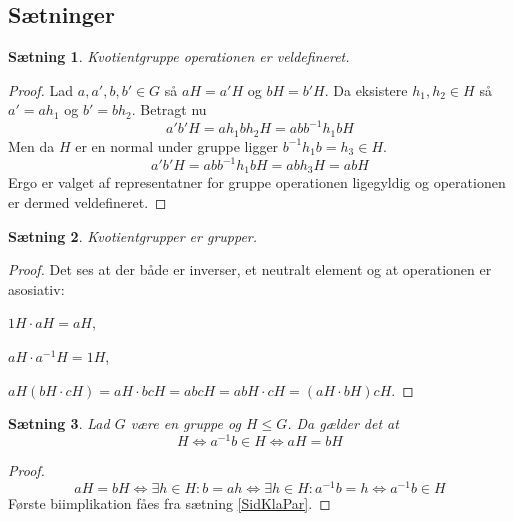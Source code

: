 \documentclass{article}
\newcommand{\inv}{^{-1}}
\newcommand{\biimp}{\Leftrightarrow}
\newtheorem{setn}{Sætning}
\begin{document}
		\subsection*{Sætninger}
		\begin{setn}
			Kvotientgruppe operationen er veldefineret.
		\end{setn}
		\begin{proof}
			Lad $a,a',b,b' \in G$ så $aH = a'H$ og $bH = b'H$. Da eksistere $h_1, h_2 \in H$
			så $a' = ah_1$ og $b' = bh_2$. Betragt nu
			$$a'b'H = ah_1bh_2H = abb\inv h_1bH$$
			Men da $H$ er en normal under gruppe ligger $b\inv h_1 b = h_3 \in H$.
			$$a'b'H = abb\inv h_1bH = abh_3H = abH$$
			Ergo er valget af representatner for gruppe operationen ligegyldig og operationen
			er dermed veldefineret.
		\end{proof}
		\begin{setn}
			Kvotientgrupper er grupper.
		\end{setn}
		\begin{proof}
			Det ses at der både er inverser, et neutralt element og at operationen er asosiativ:

			$1H\cdot aH = aH$,

			$aH\cdot a\inv H = 1H$,

			$aH(bH\cdot cH) = aH \cdot bcH = abcH = abH \cdot cH = (aH\cdot bH)cH$.
		\end{proof}
		\begin{setn}
			Lad $G$ være en gruppe og $H \le G$. Da gælder det at 
			$$H \biimp a\inv b \in H \biimp aH = bH$$
		\end{setn}
		\begin{proof}
			$$aH = bH \biimp \exists h \in H: b = ah \biimp \exists h \in H: a\inv b = h \biimp
			a\inv b \in H$$
			Første biimplikation fåes fra sætning \ref{SidKlaPar}.
		\end{proof}
\end{document}
